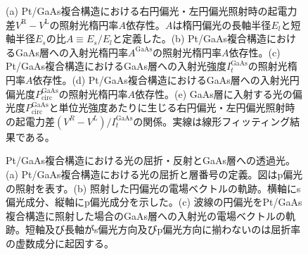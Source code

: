 \begin{figure}[tbp]
\begin{center}
\caption{(a) Pt/GaAs複合構造における右円偏光・左円偏光照射時の起電力差$V^\text{R}-V^\text{L}$の照射光楕円率$A$依存性。$A$は楕円偏光の長軸半径$E_l$と短軸半径$E_s$の比$A\equiv E_s/E_l$と定義した。(b) Pt/GaAs複合構造におけるGaAs層への入射光楕円率$A^\text{GaAs}$の照射光楕円率$A$依存性。(c) Pt/GaAs複合構造におけるGaAs層への入射光強度$I_t^\text{GaAs}$の照射光楕円率$A$依存性。(d) Pt/GaAs複合構造におけるGaAs層への入射光円偏光度$P^\text{GaAs}_\text{circ}$の照射光楕円率$A$依存性。(e) GaAs層に入射する光の偏光度$P^\text{GaAs}_\text{circ}$と単位光強度あたりに生じる右円偏光・左円偏光照射時の起電力差$(V^R-V^L)/I_t^\text{GaAs}$の関係。実線は線形フィッティング結果である。}
\label{Pellipticity} 
\end{center}
\end{figure}



\begin{figure}[tbp]
\begin{center}
\caption{Pt/GaAs複合構造における光の屈折・反射とGaAs層への透過光。(a) Pt/GaAs複合構造における光の屈折と層番号の定義。図はp偏光の照射を表す。(b) 照射した円偏光の電場ベクトルの軌跡。横軸にs偏光成分、縦軸にp偏光成分を示した。(c) 波線の円偏光をPt/GaAs複合構造に照射した場合のGaAs層への入射光の電場ベクトルの軌跡。短軸及び長軸がs偏光方向及びp偏光方向に揃わないのは屈折率の虚数成分に起因する。}
\label{fresnel} 
\end{center}
\end{figure}






